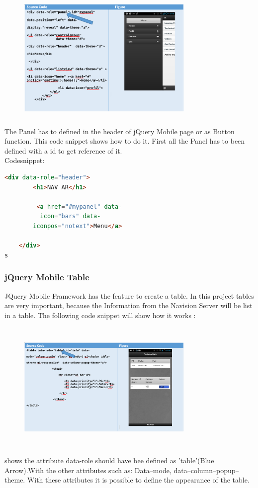 \begin{figure}[htbp]
\centering
\includegraphics[width=240pt,height=180pt,keepaspectratio]{graphics/SPanel.PNG}
\end{figure}



The Panel has to defined in the header of jQuery Mobile page or as Button function. This  code snippet  shows how to do it. First all the Panel has to been defined with a id to get reference of it.\\
Codesnippet:
\begin{lstlisting}[language=html,caption= Panel definition in Header,captionpos=b]
<div data-role="header">
        <h1>NAV AR</h1>

         <a href="#mypanel" data- 
          icon="bars" data- 
        iconpos="notext">Menu</a>

    </div>
s
\end{lstlisting}
\subsubsection{jQuery Mobile Table}
JQuery Mobile Framework has the feature to create a table. In this project tables are very important, because the Information from the Navision Server will be list in a table. The following code snippet will show how it works :
\begin{figure}[H]
\centering
\includegraphics[width=240pt,height=180pt,keepaspectratio]{graphics/Table.PNG}

\end{figure}
shows the attribute data-role should have bee defined as 'table'(Blue Arrow).With the other attributes such as:
Data--mode, data--column--popup--theme. With these attributes it is possible to define the appearance of the table.
